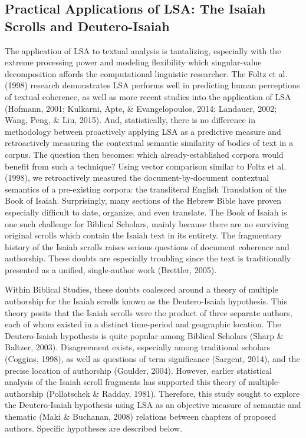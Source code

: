 \documentclass[english,man]{apa6}
\newcounter{author}
\theoremstyle{definition}
\theoremstyle{definition}
\theoremstyle{definition}
\theoremstyle{remark}
\begin{document}
\subsection{Practical Applications of LSA: The Isaiah Scrolls and
Deutero-Isaiah}\label{practical-applications-of-lsa-the-isaiah-scrolls-and-deutero-isaiah}

The application of LSA to textual analysis is tantalizing, especially
with the extreme processing power and modeling flexibility which
singular-value decomposition affords the computational linguistic
researcher. The Foltz et al. (1998) research demonstrates LSA performs
well in predicting human perceptions of textual coherence, as well as
more recent studies into the application of LSA (Hofmann, 2001;
Kulkarni, Apte, \& Evangelopoulos, 2014; Landauer, 2002; Wang, Peng, \&
Liu, 2015). And, statistically, there is no difference in methodology
between proactively applying LSA as a predictive measure and
retroactively measuring the contextual semantic similarity of bodies of
text in a corpus. The question then becomes: which already-established
corpora would benefit from such a technique? Using vector comparison
similar to Foltz et al. (1998), we retroactively measured the
document-by-document contextual semantics of a pre-existing corpora: the
transliteral English Translation of the Book of Isaiah. Surprisingly,
many sections of the Hebrew Bible have proven especially difficult to
date, organize, and even translate. The Book of Isaiah is one such
challenge for Biblical Scholars, mainly because there are no surviving
original scrolls which contain the Isaiah text in its entirety. The
fragmentary history of the Isaiah scrolls raises serious questions of
document coherence and authorship. These doubts are especially troubling
since the text is traditionally presented as a unified, single-author
work (Brettler, 2005).

Within Biblical Studies, these doubts coalesced around a theory of
multiple authorship for the Isaiah scrolls known as the Deutero-Isaiah
hypothesis. This theory posits that the Isaiah scrolls were the product
of three separate authors, each of whom existed in a distinct
time-period and geographic location. The Deutero-Isaiah hypothesis is
quite popular among Biblical Scholars (Sharp \& Baltzer, 2003).
Disagreement exists, especially among traditional scholars (Coggins,
1998), as well as questions of term significance (Sargent, 2014), and
the precise location of authorship (Goulder, 2004). However, earlier
statistical analysis of the Isaiah scroll fragments has supported this
theory of multiple-authorship (Pollatschek \& Radday, 1981). Therefore,
this study sought to explore the Deutero-Isaiah hypothesis using LSA as
an objective measure of semantic and thematic (Maki \& Buchanan, 2008)
relations between chapters of proposed authors. Specific hypotheses are
described below.
\end{document}
